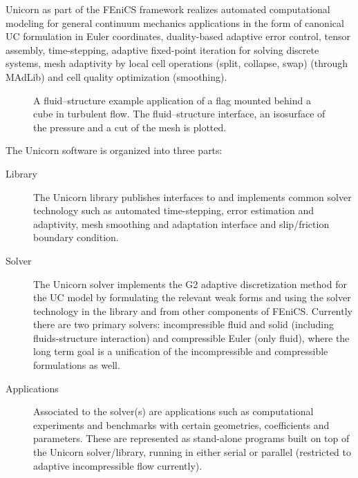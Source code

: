 Unicorn as part of the FEniCS framework realizes automated
computational modeling for general continuum mechanics applications in
the form of canonical UC formulation in Euler coordinates,
duality-based adaptive error control, tensor assembly, time-stepping,
adaptive fixed-point iteration for solving discrete systems, mesh
adaptivity by local cell operations (split, collapse, swap) (through
MAdLib) and cell quality optimization (smoothing).


\begin{figure}
\caption{A fluid--structure example application of a flag mounted behind
a cube in turbulent flow. The fluid--structure interface, an isosurface
of the pressure and a cut of the mesh is plotted.}
\label{fig:flag3D}
\end{figure}

The Unicorn software is organized into three parts:
\begin{description}
\item[Library]
The Unicorn library publishes interfaces to and implements common
solver technology such as automated time-stepping, error
estimation and adaptivity, mesh smoothing and adaptation interface and
slip/friction boundary condition.

\item[Solver]
The Unicorn solver implements the G2 adaptive discretization method
for the UC model by formulating the relevant weak forms and using the
solver technology in the library and from other components of
FEniCS. Currently there are two primary solvers: incompressible
fluid and solid (including fluids-structure interaction) and compressible
Euler (only fluid), where the long term goal is a unification of the
incompressible and compressible formulations as well.

\item[Applications]
Associated to the solver(s) are applications such as computational
experiments and benchmarks with certain geometries, coefficients and
parameters. These are represented as stand-alone programs built on top
of the Unicorn solver/library, running in either serial or parallel
(restricted to adaptive incompressible flow currently).
\end{description}

